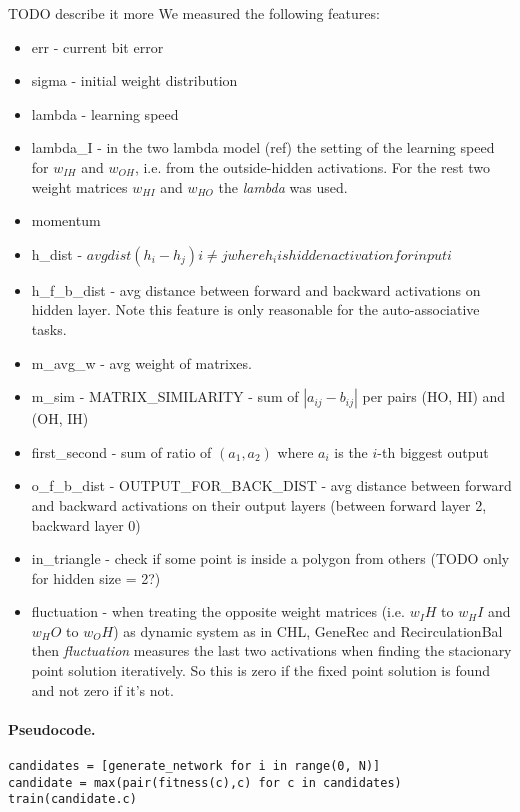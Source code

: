 TODO describe it more
We measured the following features: 
\begin{itemize} 
\item err - current bit error 
\item sigma - initial weight distribution 
\item lambda - learning speed 
\item lambda\_I - in the two lambda model (ref) the setting of the learning speed for $w_{IH}$ and $w_{OH}$, i.e. from the outside-hidden activations. For the rest two weight matrices $w_{HI}$ and $w_{HO}$ the \emph{lambda} was used. 
\item momentum
\item h\_dist - $avg dist(h_i - h_j) i \neq j where h_i is   hidden activation for input i$
\item h\_f\_b\_dist - avg distance between forward and backward activations on hidden layer. Note this feature is only reasonable for the auto-associative tasks. 
\item m\_avg\_w - avg weight of matrixes. 
\item m\_sim - MATRIX\_SIMILARITY - sum of $|a_{ij} - b_{ij}|$ per pairs (HO, HI) and (OH, IH) 
\item first\_second - sum of ratio of $(a_1, a_2)$ where $a_i$ is the $i$-th biggest output 
\item	o\_f\_b\_dist - OUTPUT\_FOR\_BACK\_DIST - avg distance between forward and backward activations on their output layers (between forward layer 2, backward layer 0) 
\item in\_triangle - check if some point is inside a polygon from others (TODO only for hidden size = 2?)
\item fluctuation - when treating the opposite weight matrices (i.e. $w_IH$ to $w_HI$ and $w_HO$ to $w_OH$) as dynamic system as in CHL, GeneRec and RecirculationBal then \emph{fluctuation} measures the last two activations when finding the stacionary point solution iteratively. So this is zero if the fixed point solution is found and not zero if it's not. 


\end{itemize} 

\paragraph{Pseudocode.} 
\begin{lstlisting} 
candidates = [generate_network for i in range(0, N)] 
candidate = max(pair(fitness(c),c) for c in candidates) 
train(candidate.c) 
\end{lstlisting} 


